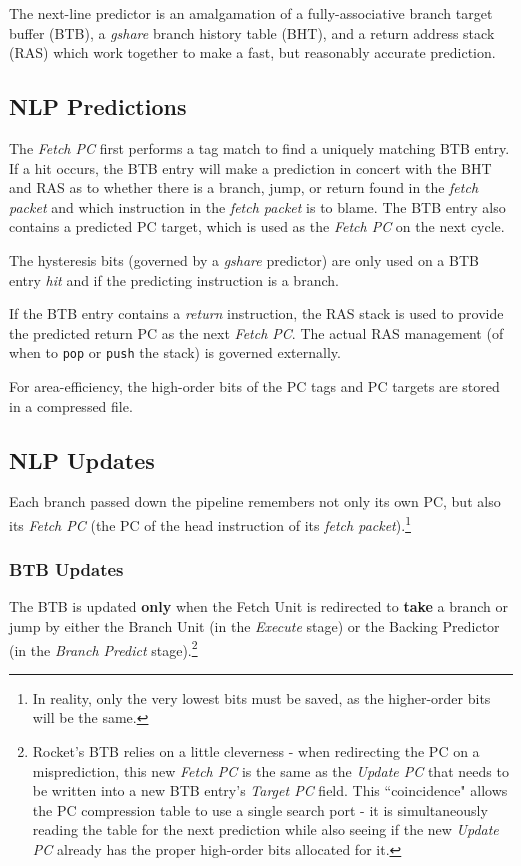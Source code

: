 The next-line predictor is an amalgamation of a fully-associative branch target buffer (BTB), a {\em gshare} branch history table (BHT), and a return address stack (RAS) which work together to make a fast, but reasonably accurate prediction.

\subsection{NLP Predictions}

The {\em Fetch PC} first performs a tag match to find a uniquely matching BTB entry.  
If a hit occurs, the BTB entry will make a prediction in concert with the BHT and RAS as to whether there is a branch, jump, or return found in the {\em fetch packet} and which instruction in the {\em fetch packet} is to blame.  
The BTB entry also contains a predicted PC target, which is used as the {\em Fetch PC} on the next cycle.



The hysteresis bits (governed by a {\em gshare} predictor) are only used on a BTB entry {\em hit} and if the predicting instruction is a branch.

If the BTB entry contains a {\em return} instruction, the RAS stack is used to provide the predicted return PC as the next {\em Fetch PC}. The actual RAS management (of when to {\tt {pop}} or {\tt {push}} the stack) is governed externally. 

For area-efficiency, the high-order bits of the PC tags and PC targets are stored in a compressed file.


\subsection{NLP Updates}

Each branch passed down the pipeline remembers not only its own PC, but also its {\em Fetch PC} (the PC of the head instruction of its {\em fetch packet}).\footnote{In reality, only the very lowest bits must be saved, as the higher-order bits will be the same.}  



\subsubsection{BTB Updates}

The BTB is updated {\bf only} when the Fetch Unit is redirected to {\bf take} a branch or jump by either the Branch Unit (in the {\em Execute} stage) or the Backing Predictor (in the {\em Branch Predict} stage).\footnote{Rocket's BTB relies on a little cleverness - when redirecting the PC on a misprediction, this new {\em Fetch PC } is the same as the {\em Update PC} that needs to be written into a new BTB entry's {\em Target PC} field. This ``coincidence" allows the PC compression table to use a single search port - it is simultaneously reading the table for the next prediction while also seeing if the new {\em Update PC} already has the proper high-order bits allocated for it.}

